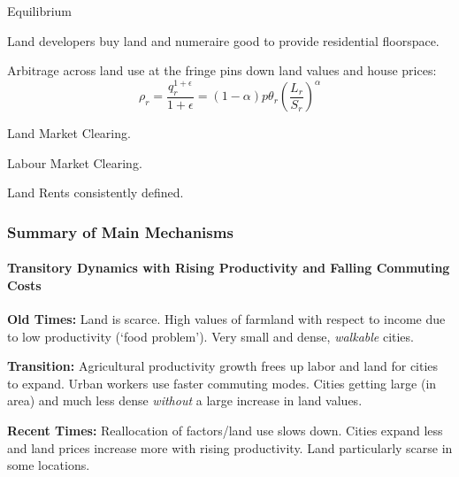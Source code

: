\documentclass[aspectratio=169]{beamer}
\begin{document}


\begin{frame}{Equilibrium}

	\begin{midi}
		\item Land developers buy land and numeraire good to provide residential floorspace.
		\item Arbitrage across land use at the fringe pins down land values and house prices:
		\begin{equation*}
			\rho_r = \frac{q_r^{1+\epsilon}}{1+\epsilon} = (1-\alpha)p \theta_r \left(\frac{L_r}{S_r}\right)^\alpha
		\end{equation*}
		\item Land Market Clearing.
		\item Labour Market Clearing.
		\item Land Rents consistently defined.
	\end{midi}

\end{frame}

\begin{frame}
	\frametitle{Summary of Main Mechanisms}
	\framesubtitle{Transitory Dynamics with Rising Productivity and Falling Commuting Costs}
	
	\begin{widei}
	\item<1-> \textbf{Old Times:} Land is scarce. High values of farmland with respect to income due to low productivity (`food problem'). Very small and dense, \emph{walkable} cities.
	\item<2-> \textbf{Transition:} Agricultural productivity growth frees up labor and land for cities to expand. Urban workers use faster commuting modes. Cities getting large (in area) and much less dense \emph{without} a large increase in land values.
	\item<3-> \textbf{Recent Times:} Reallocation of factors/land use slows down. Cities expand less and land prices increase more with rising productivity. Land particularly scarse in some locations.
	\end{widei}
	\end{frame}
\end{document}
